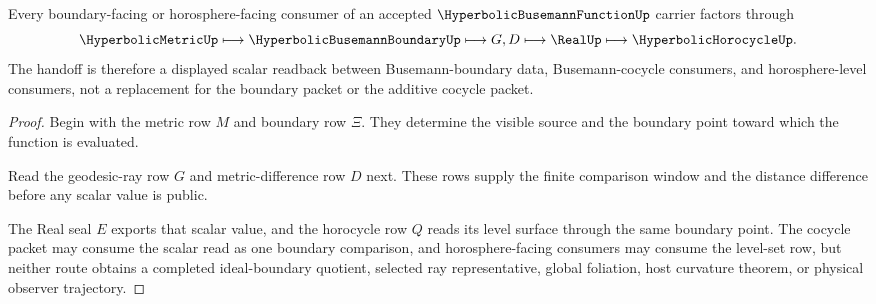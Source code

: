 \begin{theorem}
\label{thm:hyperbolic-busemann-function-boundary-handoff}
Every boundary-facing or horosphere-facing consumer of an accepted $\HyperbolicBusemannFunctionUp$ carrier factors through
$$
\HyperbolicMetricUp
\longmapsto
\HyperbolicBusemannBoundaryUp
\longmapsto
G,D
\longmapsto
\RealUp
\longmapsto
\HyperbolicHorocycleUp .
$$
The handoff is therefore a displayed scalar readback between Busemann-boundary data, Busemann-cocycle consumers, and horosphere-level consumers, not a replacement for the boundary packet or the additive cocycle packet.
\end{theorem}
\begin{proof}
Begin with the metric row $M$ and boundary row $\Xi$. They determine the visible source and the boundary point toward which the function is evaluated.

Read the geodesic-ray row $G$ and metric-difference row $D$ next. These rows supply the finite comparison window and the distance difference before any scalar value is public.

The Real seal $E$ exports that scalar value, and the horocycle row $Q$ reads its level surface through the same boundary point. The cocycle packet may consume the scalar read as one boundary comparison, and horosphere-facing consumers may consume the level-set row, but neither route obtains a completed ideal-boundary quotient, selected ray representative, global foliation, host curvature theorem, or physical observer trajectory.
\end{proof}



